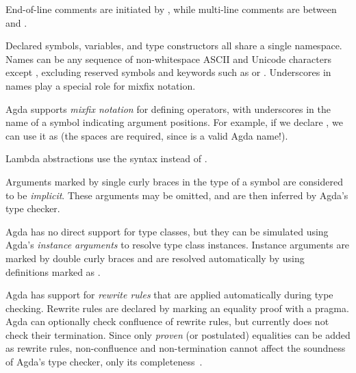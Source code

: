 \begin{description}
\tightlist
\item[Comments.]
End-of-line comments are initiated by \AgdaRef{-\/-}, while multi-line
comments are between \AgdaRef{\{-} and \AgdaRef{-\}}.
\item[Naming.]
Declared symbols, variables, and type constructors all share a single
namespace. Names can be any sequence of non-whitespace ASCII and Unicode
characters except , excluding reserved symbols and
keywords such as  or . Underscores in names play
a special role for mixfix notation.
\item[Mixfix notation.]
Agda supports \emph{mixfix notation} for defining operators, with
underscores in the name of a symbol indicating argument positions. For
example, if we declare , we can
use it as  (the spaces are required, since 
is a valid Agda name!).
\item[Anonymous functions.]
Lambda abstractions use the syntax  instead of
.
\item[Implicit arguments.]
Arguments marked by single curly braces  in the type of a
symbol are considered to be \emph{implicit}. These arguments may be
omitted, and are then inferred by Agda's type checker.
\item[Type classes.]
Agda has no direct support for type classes, but they can be simulated
using Agda's \emph{instance arguments} to resolve type class instances.
Instance arguments are marked by double curly braces 
and are resolved automatically by using definitions marked as
.
\item[Rewrite rules.]
Agda has support for \emph{rewrite rules}
\cite{Cockx2020TTU}
that are applied automatically during type checking. Rewrite rules are
declared by marking an equality proof  with a
 pragma. Agda can optionally check
confluence of rewrite rules, but currently does not check their
termination. Since only \emph{proven} (or postulated) equalities can be
added as rewrite rules, non-confluence and non-termination cannot affect
the soundness of Agda's type checker, only its
completeness~\cite{Cockx2021TRT}.
\end{description}
